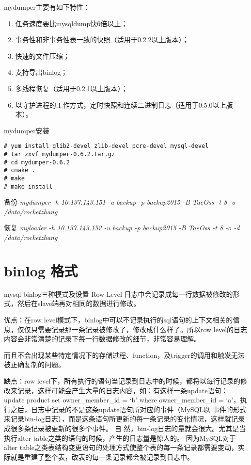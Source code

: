 mydumper主要有如下特性：
\begin{enumerate}
\item 任务速度要比mysqldump快6倍以上；
\item 事务性和非事务性表一致的快照（适用于0.2.2以上版本）；
\item 快速的文件压缩；
\item 支持导出binlog；
\item 多线程恢复（适用于0.2.1以上版本）；
\item 以守护进程的工作方式，定时快照和连续二进制日志（适用于0.5.0以上版本）。
 \end{enumerate}

mydumper安装
\begin{lstlisting}
# yum install glib2-devel zlib-devel pcre-devel mysql-devel
# tar zxvf mydumper-0.6.2.tar.gz
# cd mydumper-0.6.2
# cmake .
# make
# make install	
\end{lstlisting}

备份
\textit{ mydumper -h 10.137.143.151 -u backup -p backup2015 -B TaeOss -t 8 -o /data/rocketzhang}

恢复
\textit{ myloader -h 10.137.143.152 -u backup -p backup2015 -B TaeOss -t 8 -o -d /data/rocketzhang}
 
\section{binlog 格式}
mysql binlog三种模式及设置
Row Level
日志中会记录成每一行数据被修改的形式，然后在slave端再对相同的数据进行修改。

优点：在row level模式下，binlog中可以不记录执行的sql语句的上下文相关的信息，仅仅只需要记录那一条记录被修改了，修改成什么样了。所以row level的日志内容会非常清楚的记录下每一行数据修改的细节，非常容易理解。

而且不会出现某些特定情况下的存储过程、function，及trigger的调用和触发无法被正确复制的问题。

缺点：row level下，所有执行的语句当记录到日志中的时候，都将以每行记录的修改来记录，这样可能会产生大量的日志内容，如：有这样一条update语句：
update product set owner_member_id = ‘b’ where owner_member_id = ‘a’，执行之后，日志中记录的不是这条update语句所对应的事件（MySQL以 事件的形式来记录bin-log日志），而是这条语句所更新的每一条记录的变化情况，这样就记录成很多条记录被更新的很多个事件。
自 然，bin-log日志的量就会很大。尤其是当执行alter table之类的语句的时候，产生的日志量是惊人的。
因为MySQL对于alter table之类表结构变更语句的处理方式使整个表的每一条记录都需要变动，实际就是重建了整个表，改表的每一条记录都会被记录到日志中。

